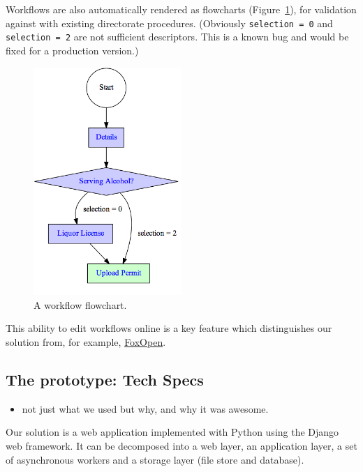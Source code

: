 \documentclass[12pt,a4paper,twosided]{article}
\begin{document}
Workflows are also automatically rendered as flowcharts (Figure~\ref{fig:workflow-flowchart}), 
for validation against with existing directorate procedures. (Obviously
\texttt{selection = 0} and \texttt{selection = 2} are not sufficient
descriptors. This is a known bug and would be fixed for a production
version.)

\begin{figure}[H]
  \centering
  \includegraphics[width=0.5\textwidth]{workflow.png}
  \caption{A workflow flowchart.}
  \label{fig:workflow-flowchart}
\end{figure}

This ability to edit workflows online is a key feature which
distinguishes our solution from, for example,
\href{http://www.foxopen.net/}{FoxOpen}.

\subsection{The prototype: Tech Specs}

\begin{itemize}

\item
  not just what we used but why, and why it was awesome.
\end{itemize}

Our solution is a web application implemented with Python using the
Django web framework. It can be decomposed into a web layer, an
application layer, a set of asynchronous workers and a storage layer
(file store and database).
\end{document}

